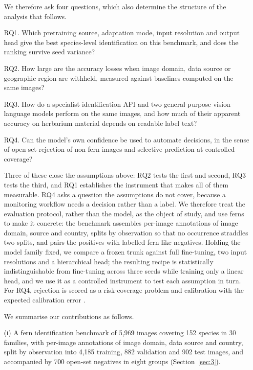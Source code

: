 \documentclass[preprint,12pt,authoryear]{elsarticle}
\begin{document}
We therefore ask four questions, which also determine the structure of the analysis that follows.

RQ1. Which pretraining source, adaptation mode, input resolution and output head give the best species-level identification on this benchmark, and does the ranking survive seed variance?

RQ2. How large are the accuracy losses when image domain, data source or geographic region are withheld, measured against baselines computed on the same images?

RQ3. How do a specialist identification API and two general-purpose vision--language models perform on the same images, and how much of their apparent accuracy on herbarium material depends on readable label text?

RQ4. Can the model's own confidence be used to automate decisions, in the sense of open-set rejection of non-fern images and selective prediction at controlled coverage?

Three of these close the assumptions above: RQ2 tests the first and second, RQ3 tests the third, and RQ1 establishes the instrument that makes all of them measurable. RQ4 asks a question the assumptions do not cover, because a monitoring workflow needs a decision rather than a label. We therefore treat the evaluation protocol, rather than the model, as the object of study, and use ferns to make it concrete: the benchmark assembles per-image annotations of image domain, source and country, splits by observation so that no occurrence straddles two splits, and pairs the positives with labelled fern-like negatives. Holding the model family fixed, we compare a frozen trunk against full fine-tuning, two input resolutions and a hierarchical head; the resulting recipe is statistically indistinguishable from fine-tuning across three seeds while training only a linear head, and we use it as a controlled instrument to test each assumption in turn. For RQ4, rejection is scored as a risk-coverage problem \citep{geifman2017} and calibration with the expected calibration error \citep{guo2017}.

We summarise our contributions as follows.

(i) A fern identification benchmark of 5,969 images covering 152 species in 30 families, with per-image annotations of image domain, data source and country, split by observation into 4,185 training, 882 validation and 902 test images, and accompanied by 700 open-set negatives in eight groups (Section~\ref{sec:3}).
\end{document}
